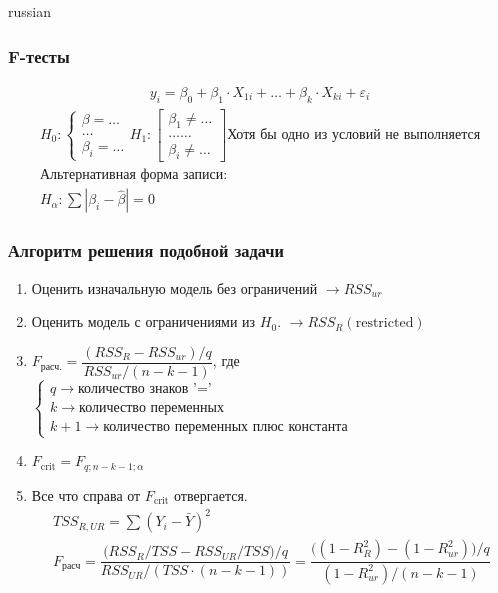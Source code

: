 \documentclass{article}
\begin{document}
\begin{otherlanguage*}{russian}
\subsubsection*{F-тесты}
\begin{align*}
y_i = \beta_0 + \beta_1 \cdot X_{1i} + \ldots + \beta_{k} \cdot X_{ki} + \varepsilon_i 
\end{align*}
\begin{align*}
H_0: \begin{cases}
\beta = \ldots \\
\ldots \\
\beta_i = \ldots  
\end{cases}
H_1 : \begin{bmatrix}
\beta_1 \ne \ldots \\
\ldots \ldots \\
\beta_i \ne \ldots 
\end{bmatrix} \text{Хотя бы одно из условий не выполняется} \\
\text{Альтернативная форма записи:} \\
H_\alpha : \sum | \beta_i - \hat \beta | = 0 
\end{align*}

\subsubsection*{Алгоритм решения подобной задачи}
\begin{enumerate}
\item Оценить изначальную модель без ограничений $ \rightarrow RSS_{ur} $ 
\item Оценить модель с ограничениями из $ H_0 $. $ \rightarrow RSS_{R} (\text{restricted}) $ 	
\item $ F_{\text{расч.}} = \dfrac{(RSS_R - RSS_{ur}) / q}{RSS_{ur} / (n - k - 1)} $, где $ \begin{cases} q \rightarrow  \text{количество знаков '='} \\ k \rightarrow \text{количество переменных} \\ k+1 \rightarrow \text{количество переменных плюс константа} \end{cases} $
\item $
F_{\text{crit}} = F_{q; n-k-1; \alpha} 
$

\item Все что справа от $F_{\text{crit}} $ отвергается. 
\begin{align*}
TSS_{R, UR}  = \sum (Y_i - \bar{Y}) ^ 2 \\
F_{\text{расч}} = \dfrac{\Big( RSS_R / TSS - RSS_{UR} / TSS \Big) / q}{RSS_{UR} / (TSS \cdot (n - k - 1) )}  = \dfrac{\Big( (1 - R^2_R) - (1 - R^2_{ur})\Big) /q}{(1 - R^2_{ur} ) / (n - k - 1) } \\
\end{align*}

\end{enumerate}
\end{otherlanguage*}
\end{document}
